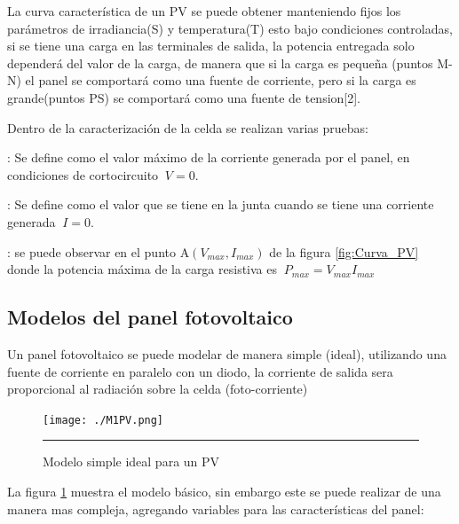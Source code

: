 La curva característica de un PV  se puede obtener manteniendo fijos los parámetros de irradiancia(S) y temperatura(T) esto bajo condiciones controladas, si se tiene una carga en las terminales de salida, la potencia entregada solo dependerá del valor de la carga, de manera que si la carga es pequeña (puntos M-N) el panel se comportará como una fuente de corriente, pero si la carga es grande(puntos PS) se comportará como una fuente de tension[2]. 

Dentro de la caracterización de la celda se realizan varias pruebas: 

\begin{compactitem}

\item {}: Se define como el valor máximo de la corriente generada por el panel, en condiciones de cortocircuito $\ V=0$.


\item {}: Se define como el valor que se tiene en la junta  cuando se tiene una corriente generada $\ I=0$.

\item  {}: se puede observar en el punto A$\left(V_{max},I_{max} \right)$ de la figura \ref{fig:Curva_PV} donde la potencia máxima de la carga resistiva es $\ P_{max} = V_{max}I_{max}$


\end{compactitem}



\subsection{Modelos del panel fotovoltaico}

Un panel fotovoltaico se puede modelar de manera simple (ideal), utilizando una fuente de corriente en paralelo con un diodo, la corriente de salida sera proporcional al radiación sobre la celda (foto-corriente)

\begin{figure}[H]
  \centering
    \texttt{[image: ./M1PV.png]}
    \rule{35em}{0.5pt}
  \caption[Modelo simple ideal para un PV]{ Modelo simple ideal para un PV}
  \label{fig:Modelo1_PV}
\end{figure}

La figura \ref{fig:Modelo1_PV} muestra el modelo básico, sin embargo este se puede realizar de una manera mas compleja, agregando variables para las características del panel: 

